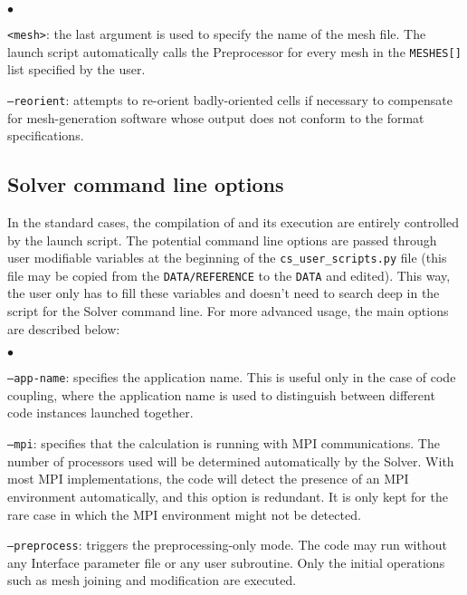 {{{{\begin{list}{$\bullet$}{}
\item \texttt{<mesh>}: the last argument is used to specify the name of the mesh file.
The launch script automatically calls the Preprocessor for every
mesh in the \texttt{MESHES[]} list specified by the user.

\item \texttt{--reorient}: attempts to re-orient badly-oriented cells
if necessary to compensate for mesh-generation software
whose output does not conform to the format specifications.

\end{list}

\subsection{Solver command line options}
\label{sec:prg_optappelnoy}%
In the standard cases, the compilation of \CS and its execution are entirely
controlled by the launch script. The potential command line options are passed
through user modifiable variables at the beginning of the \texttt{cs\_user\_scripts.py} file
(this file may be copied from the \texttt{DATA/REFERENCE} to the \texttt{DATA} and edited).
This way, the user only has to fill these variables and doesn't need
to search deep in the script for the Solver command line. For more advanced
usage, the main options are described below:

\begin{list}{$\bullet$}{}
\item \texttt{--app-name}: specifies the application name. This is
useful only in the case of code coupling, where the application name
is used to distinguish between different code instances launched together.

\item \texttt{--mpi}: specifies that the calculation is running
with MPI communications. The number of processors used will be determined
automatically by the Solver. With most MPI implementations, the
code will detect the presence of an MPI environment automatically, and
this option is redundant. It is only kept for the rare case in which the
MPI environment might not be detected.

\item \texttt{--preprocess}: triggers the preprocessing-only mode.
The code may run without any Interface parameter file or any user subroutine.
Only the initial operations such as mesh joining and modification are
executed.


\end{list}}}}}
